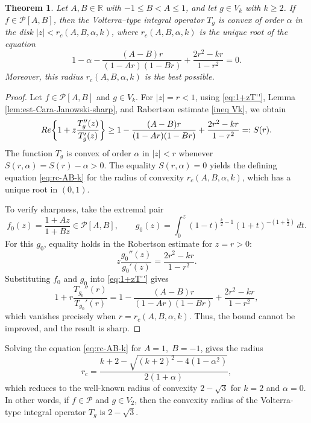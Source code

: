 \documentclass[12pt,a4paper]{amsart}
\numberwithin{equation}{section}
\newtheorem{theorem}{Theorem}[section]
\theoremstyle{remark}
\begin{document}
\begin{theorem}\label{theorem f PAB g in Vk improved}
Let $A,B\in\mathbb{R}$ with $-1\le B<A\le1$, and let $g\in V_k$ with $k\ge2$.  
If $f\in\mathcal{P}[A,B]$, then the Volterra--type integral operator $T_g$ is convex of order $\alpha$ in the disk $|z|<r_c(A,B,\alpha,k)$, where $r_c(A,B,\alpha,k)$ is the unique root of the equation
\begin{equation}\label{eq:rc-AB-k}
1-\alpha-\frac{(A-B)r}{(1-A r)(1-B r)} + \frac{2r^2 - k r}{1-r^2}=0.
\end{equation}
Moreover, this radius $r_c(A,B,\alpha,k)$ is the best possible.
\end{theorem}

\begin{proof}
Let $f\in\mathcal{P}[A,B]$ and $g\in V_k$.  
For $|z|=r<1$, using \eqref{eq:1+zT''}, Lemma \ref{lem:est-Cara-Janowski-sharp}, and Rabertson estimate \eqref{ineq Vk},
we obtain
\[
{\rm Re}\!\left\{1+z\frac{T_g''(z)}{T_g'(z)}\right\}
\ge 1 - \frac{(A-B)r}{(1-A r)(1-B r)} + \frac{2r^2 - k r}{1-r^2}
=: S(r).
\]
The function $T_g$ is convex of order $\alpha$ in $|z|<r$ whenever $S(r,\alpha)=S(r)-\alpha>0$.  
The equality $S(r,\alpha)=0$ yields the defining equation \eqref{eq:rc-AB-k} for the radius of convexity $r_c(A,B,\alpha,k)$, which has a unique root in $(0,1)$.

To verify sharpness, take the extremal pair
\[
f_0(z)=\frac{1+Az}{1+Bz}\in\mathcal{P}[A,B], 
\qquad
g_0(z)=\int_0^z (1-t)^{\frac{k}{2}-1}(1+t)^{-\left(1+\frac{k}{2}\right)}\,dt.
\]
For this $g_0$, equality holds in the Robertson estimate for $z=r>0$:
\[
z\frac{g_0''(z)}{g_0'(z)}=\frac{2r^2 - k r}{1-r^2}.
\]
Substituting $f_0$ and $g_0$ into \eqref{eq:1+zT''} gives
\[
1 + r\frac{T_{g_0}''(r)}{T_{g_0}'(r)} 
= 1 - \frac{(A-B)r}{(1-A r)(1-B r)} + \frac{2r^2 - k r}{1-r^2},
\]
which vanishes precisely when $r=r_c(A,B,\alpha,k)$.  
Thus, the bound cannot be improved, and the result is sharp.
\end{proof}

Solving the equation \eqref{eq:rc-AB-k} for $A=1,\;B=-1$, gives the radius
\begin{equation*}
   r_c=\frac{k+2-\sqrt{(k+2)^2-4(1-\alpha^2)}}{2(1+\alpha)},
\end{equation*}
which reduces to the well-known radius of convexity $2-\sqrt{3}$ for $k=2$ and $\alpha=0$. In other words, if $f\in\mathcal{P}$ and $g\in V_2$, then the convexity radius of the Volterra-type integral operator $T_g$ is $2-\sqrt{3}$.
\end{document}
